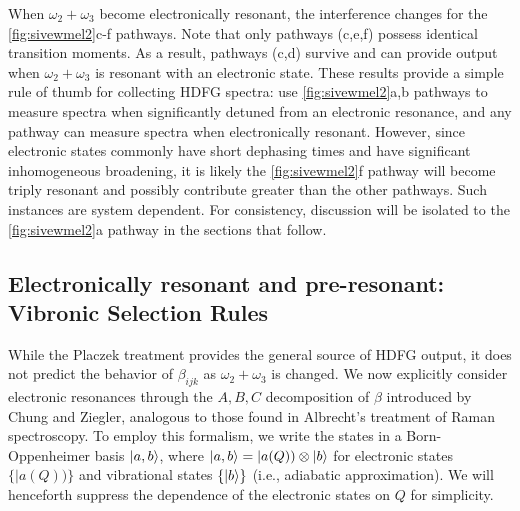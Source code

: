 \documentclass[aip, jcp, reprint, onecolumn]{revtex4-2}
\begin{document}
When $\omega_2 + \omega_3$ become electronically resonant, the interference changes for the \autoref{fig:sivewmel2}c-f pathways.
Note that only pathways (c,e,f) possess identical transition moments.
As a result, pathways (c,d) survive and can provide output when $\omega_2+\omega_3$ is resonant with an electronic state. 
These results provide a simple rule of thumb for collecting HDFG spectra: use \autoref{fig:sivewmel2}a,b pathways to measure spectra when significantly detuned from an electronic resonance, and any pathway can measure spectra when electronically resonant.
However, since electronic states commonly have short dephasing times and have significant inhomogeneous broadening,\cite{Dong2015, Lewis2015} it is likely the \autoref{fig:sivewmel2}f pathway will become triply resonant and possibly contribute greater than the other pathways. 
Such instances are system dependent. 
For consistency, discussion will be isolated to the \autoref{fig:sivewmel2}a pathway in the sections that follow.

\subsection{Electronically resonant and pre-resonant: Vibronic Selection Rules}

While the Placzek treatment provides the general source of HDFG output, it does not predict the behavior of $\beta_{ijk}$ as $\omega_2 + \omega_3$ is changed.
We now explicitly consider electronic resonances through the $A,B,C$ decomposition of $\beta$ introduced by Chung and Ziegler, analogous to those found in Albrecht's treatment of Raman spectroscopy.\cite{Albrecht1961, Ziegler1988} 
To employ this formalism, we write the states in a Born-Oppenheimer basis $\ket{a,b}$, where $\ket{a,b} = |a(Q)) \otimes \ket{b}$ for electronic states $\{|a(Q))\}$ and vibrational states $\{\ket{b}\}$ (i.e., adiabatic approximation). \cite{BornOppenheimer, Tang1970}
We will henceforth suppress the dependence of the electronic states on $Q$ for simplicity.
\end{document}
